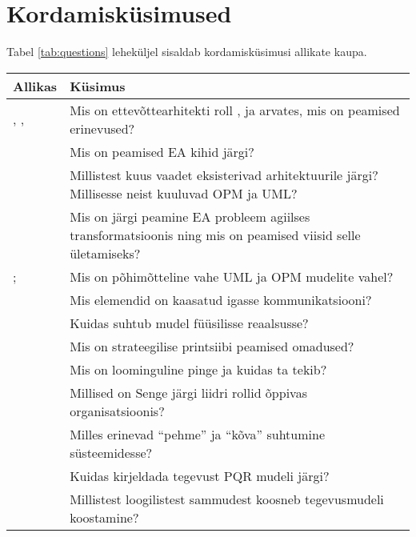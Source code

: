 \documentclass[nobib]{tufte-handout}
\begin{document}
\section{Kordamisküsimused}
Tabel \ref{tab:questions} leheküljel \pageref{tab:questions} sisaldab kordamisküsimusi allikate kaupa. 

\begin{table*}[ht]
\small
	\centering
	\selectfont
	\begin{tabular}{p{4.5cm}p{11cm}}
		\toprule
		Allikas & Küsimus \\
		\midrule
		\cite{parsons2005enterprise}, \cite{sysengineering}, \cite{winter2006essential} & Mis on ettevõttearhitekti roll \citeauthor{parsons2005enterprise}, \citeauthor{sysengineering} ja \citeauthor{winter2006essential} arvates, mis on peamised erinevused?\\
		\cite{winter2006essential} & Mis on peamised EA kihid \cite{winter2006essential} järgi?\\
		\cite{sysengineering} & Millistest kuus vaadet eksisterivad arhitektuurile \citeauthor{sysengineering} järgi? Millisesse neist kuuluvad OPM ja UML? \\
		\cite{hickey} & Mis on \citeauthor{hickey} järgi peamine EA probleem agiilses transformatsioonis ning mis on peamised viisid selle ületamiseks? \\
\cite{OPM}; \cite{heumann2005introduction} & Mis on põhimõtteline vahe UML ja OPM mudelite vahel? \\
\cite[peatükk 3]{ferenvcik2004survey} &  Mis elemendid on kaasatud igasse kommunikatsiooni?\\
\cite{box1976science}&  Kuidas suhtub mudel füüsilisse reaalsusse?\\
\cite{gadiesh2001transforming} & Mis on strateegilise printsiibi peamised omadused? \\
\cite{senge2002leader} & Mis on loominguline pinge ja kuidas ta tekib? \\
& Millised on Senge järgi liidri rollid õppivas organisatsioonis? \\

\cite{checkland2000soft} & Milles erinevad \enquote{pehme} ja \enquote{kõva} suhtumine süsteemidesse? \\
 & Kuidas kirjeldada tegevust PQR mudeli järgi?\\
 & Millistest loogilistest sammudest koosneb tegevusmudeli koostamine?\\


\end{tabular}
\end{table*}
\end{document}
